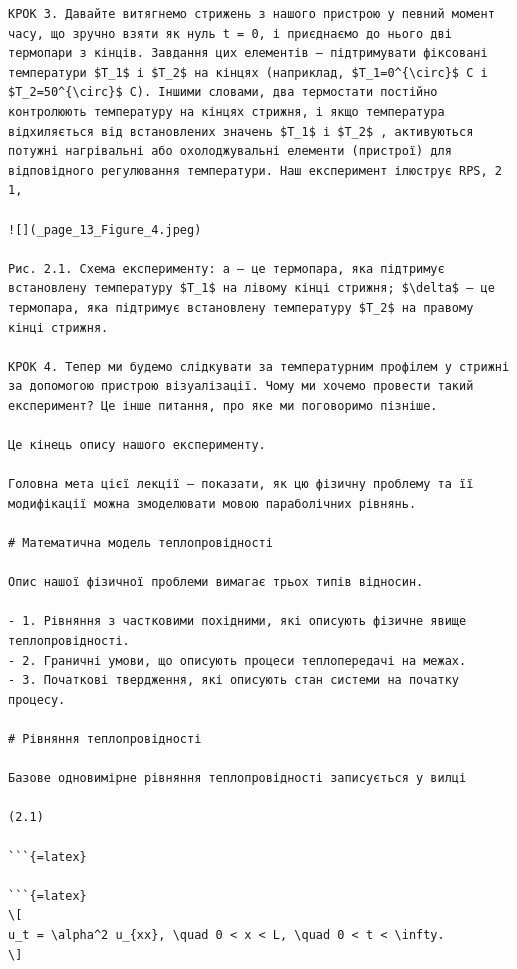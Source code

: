 \documentclass[
]{article}
\begin{document}
\begin{verbatim}
КРОК 3. Давайте витягнемо стрижень з нашого пристрою у певний момент часу, що зручно взяти як нуль t = 0, і приєднаємо до нього дві термопари з кінців. Завдання цих елементів — підтримувати фіксовані температури $T_1$ і $T_2$ на кінцях (наприклад, $T_1=0^{\circ}$ C і $T_2=50^{\circ}$ C). Іншими словами, два термостати постійно контролюють температуру на кінцях стрижня, і якщо температура відхиляється від встановлених значень $T_1$ і $T_2$ , активуються потужні нагрівальні або охолоджувальні елементи (пристрої) для відповідного регулювання температури. Наш експеримент ілюструє RPS, 2 1,

![](_page_13_Figure_4.jpeg)

Рис. 2.1. Схема експерименту: a — це термопара, яка підтримує встановлену температуру $T_1$ на лівому кінці стрижня; $\delta$ — це термопара, яка підтримує встановлену температуру $T_2$ на правому кінці стрижня.

КРОК 4. Тепер ми будемо слідкувати за температурним профілем у стрижні за допомогою пристрою візуалізації. Чому ми хочемо провести такий експеримент? Це інше питання, про яке ми поговоримо пізніше.

Це кінець опису нашого експерименту.

Головна мета цієї лекції — показати, як цю фізичну проблему та її модифікації можна змоделювати мовою параболічних рівнянь.

# Математична модель теплопровідності

Опис нашої фізичної проблеми вимагає трьох типів відносин.

- 1. Рівняння з частковими похідними, які описують фізичне явище теплопровідності.
- 2. Граничні умови, що описують процеси теплопередачі на межах.
- 3. Початкові твердження, які описують стан системи на початку процесу.

# Рівняння теплопровідності

Базове одновимірне рівняння теплопровідності записується у вилці

(2.1)

```{=latex}

```{=latex}
\[
u_t = \alpha^2 u_{xx}, \quad 0 < x < L, \quad 0 < t < \infty.
\]
\end{verbatim}
\end{document}
